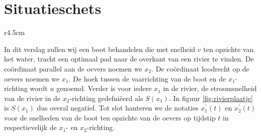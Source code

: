 \chapter{Situatieschets}\label{sec:situatieschets}

\begin{wrapfigure}{r}{4.5cm}
	
	\caption{De situatie}\label{fig:rivierplaatje}
\end{wrapfigure}

In dit verslag zullen wij een boot behandelen die met snelheid \( v \) ten opzichte van het water, tracht een optimaal pad naar de overkant van een rivier te vinden. 
De co\"ordinaat parallel aan de oevers noemen we \( x_2 \). De co\"ordinaat loodrecht op de oevers noemen we \( x_1 \). 
De hoek tussen de vaarrichting van de boot en de $ x_1 $-richting wordt $ u $ genoemd. Verder is voor iedere $ x_1 $ in de rivier, de stroomsnelheid van de rivier in de $ x_2 $-richting gedefni\"eerd als $ S(x_1) $. 
In figuur \ref{fig:rivierplaatje} is $ S(x_1) $ dus overal negatief. 
Tot slot hanteren we de notaties $ x_1^\prime(t) $ en $ x_2^\prime(t) $ voor de snelheden van de boot ten opzichte van de oevers op tijdstip $ t $ in respectievelijk de $ x_1 $- en $ x_2 $-richting.